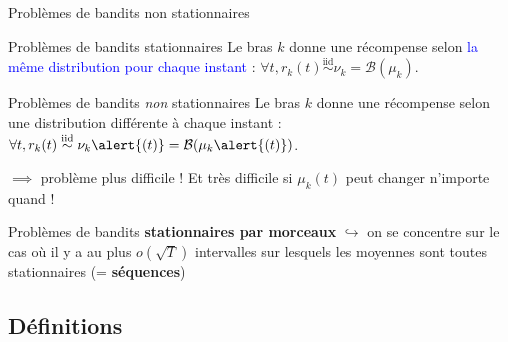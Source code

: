 \documentclass[11pt,french,ignorenonframetext,]{beamer}
\begin{document}





\begin{frame}{Problèmes de bandits non stationnaires}

  \begin{block}{Problèmes de bandits stationnaires}
    Le bras $k$ donne une récompense selon \textcolor{blue}{la même distribution pour chaque instant} :
    $\forall t, r_k(t) \overset{\text{iid}}{\sim} \nu_k = \mathcal{B}(\mu_k)$.
  \end{block}

  \pause
  \begin{alertblock}{Problèmes de bandits \emph{non} stationnaires}
    Le bras $k$ donne une récompense selon \alert{une distribution différente à chaque instant} :
    $\forall t, r_k(t) \overset{\text{iid}}{\sim} \nu_k\alert{(t)} = \mathcal{B}(\mu_k\alert{(t)})$.
  \end{alertblock}

  $\implies$ \dXey{} problème plus difficile !
  Et très difficile si $\mu_k(t)$ peut changer n'importe quand !

  \pause
  \begin{block}{Problèmes de bandits \textbf{stationnaires par morceaux}}
    $\hookrightarrow$ on se concentre sur le cas où il y a au plus $o(\sqrt{T})$ intervalles sur lesquels les moyennes sont toutes stationnaires (= \textbf{séquences})
  \end{block}
\end{frame}

\subsection{\hfill{}Définitions\hfill{}}
\end{document}
